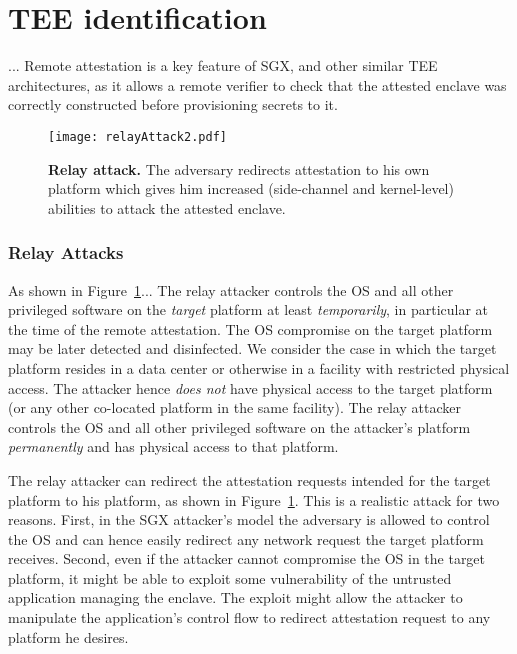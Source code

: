 
\section*{TEE identification}

\cite{proximitee}...
Remote attestation is a key feature of SGX, and other similar TEE architectures, as it allows a remote verifier to check that the attested enclave was correctly constructed before provisioning secrets to it. 

\begin{figure}[t]
	\centering
	\texttt{[image: relayAttack2.pdf]}
	\caption{\textbf{Relay attack.} The adversary redirects attestation to his own platform which gives him increased (side-channel and kernel-level) abilities to attack the attested enclave.}
	\label{fig:SystemModel}
\end{figure}


\subsubsection*{Relay Attacks}

As shown in Figure~\ref{fig:SystemModel}... The relay attacker controls the OS and all other privileged software on the \emph{target} platform at least \emph{temporarily}, in particular at the time of the remote attestation. The OS compromise on the target platform may be later detected and disinfected. We consider the case in which the target platform resides in a data center or otherwise in a facility with restricted physical access. The attacker hence \emph{does not} have physical access to the target platform (or any other co-located platform in the same facility).
The relay attacker controls the OS and all other privileged software on the attacker's platform \emph{permanently} and has physical access to that platform. 

The relay attacker can redirect the attestation requests intended for the target platform to his platform, as shown in Figure~\ref{fig:SystemModel}. This is a realistic attack for two reasons. First, in the SGX attacker's model the adversary is allowed to control the OS and can hence easily redirect any network request the target platform receives. Second, even if the attacker cannot compromise the OS in the target platform, it might be able to exploit some vulnerability of the untrusted application managing the enclave. The exploit might allow the attacker to manipulate the application's control flow to redirect attestation request to any platform he desires.


